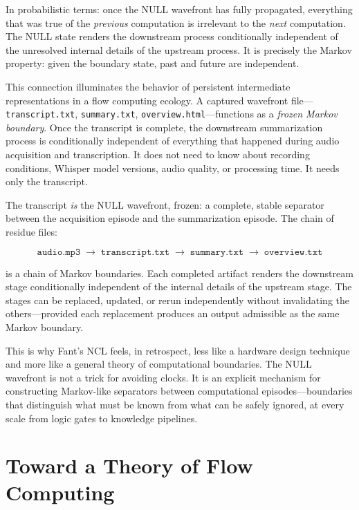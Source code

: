 \documentclass[12pt, a4paper]{article}
\begin{document}
In probabilistic terms: once the NULL wavefront has fully
propagated, everything that was true of the \emph{previous}
computation is irrelevant to the \emph{next} computation. The
NULL state renders the downstream process conditionally
independent of the unresolved internal details of the upstream
process. It is precisely the Markov property: given the
boundary state, past and future are independent.

This connection illuminates the behavior of persistent
intermediate representations in a flow computing ecology.
A captured wavefront file---\texttt{transcript.txt},
\texttt{summary.txt}, \texttt{overview.html}---functions as
a \emph{frozen Markov boundary}. Once the transcript is
complete, the downstream summarization process is
conditionally independent of everything that happened during
audio acquisition and transcription. It does not need to know
about recording conditions, Whisper model versions, audio
quality, or processing time. It needs only the transcript.

The transcript \emph{is} the NULL wavefront, frozen: a
complete, stable separator between the acquisition episode
and the summarization episode. The chain of residue files:

\[
\texttt{audio.mp3} \;\to\; \texttt{transcript.txt} \;\to\;
\texttt{summary.txt} \;\to\; \texttt{overview.txt}
\]

is a chain of Markov boundaries. Each completed artifact
renders the downstream stage conditionally independent of the
internal details of the upstream stage. The stages can be
replaced, updated, or rerun independently without invalidating
the others---provided each replacement produces an output
admissible as the same Markov boundary.

This is why Fant's NCL feels, in retrospect, less like a
hardware design technique and more like a general theory of
computational boundaries. The NULL wavefront is not a trick
for avoiding clocks. It is an explicit mechanism for
constructing Markov-like separators between computational
episodes---boundaries that distinguish what must be known
from what can be safely ignored, at every scale from logic
gates to knowledge pipelines.

\section{Toward a Theory of Flow Computing}
\end{document}
